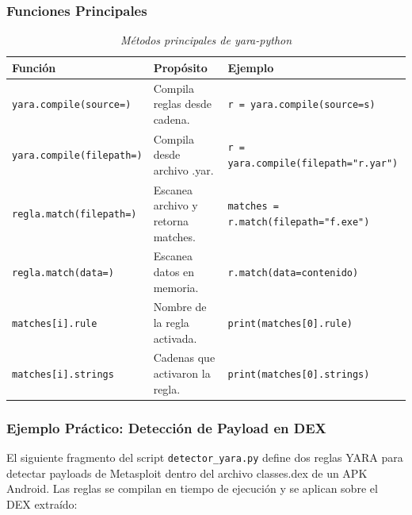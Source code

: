 \documentclass[12pt,a4paper]{article}
\begin{document}
\subsubsection{Funciones Principales}

\begin{table}[H]
\centering
\begin{threeparttable}
\caption{\textit{Métodos principales de yara-python}}
\begin{tabular}{p{3.5cm}p{5cm}p{4.5cm}}
\toprule
\textbf{Función} & \textbf{Propósito} & \textbf{Ejemplo} \\
\midrule
\texttt{yara.compile(source=)} & Compila reglas desde cadena. & \texttt{r = yara.compile(source=s)} \\
\texttt{yara.compile(filepath=)} & Compila desde archivo .yar. & \texttt{r = yara.compile(filepath="r.yar")} \\
\texttt{regla.match(filepath=)} & Escanea archivo y retorna matches. & \texttt{matches = r.match(filepath="f.exe")} \\
\texttt{regla.match(data=)} & Escanea datos en memoria. & \texttt{r.match(data=contenido)} \\
\texttt{matches[i].rule} & Nombre de la regla activada. & \texttt{print(matches[0].rule)} \\
\texttt{matches[i].strings} & Cadenas que activaron la regla. & \texttt{print(matches[0].strings)} \\
\bottomrule
\end{tabular}
\end{threeparttable}
\end{table}

\subsubsection{Ejemplo Práctico: Detección de Payload en DEX}

El siguiente fragmento del script \texttt{detector\_yara.py} define
dos reglas YARA para detectar payloads de Metasploit dentro del archivo
classes.dex de un APK Android. Las reglas se compilan en tiempo de
ejecución y se aplican sobre el DEX extraído:
\end{document}
